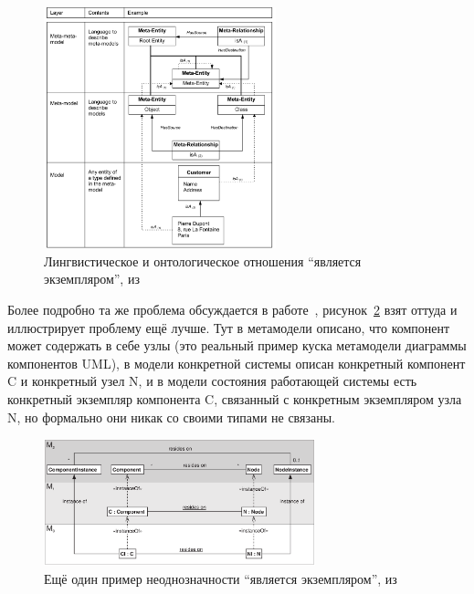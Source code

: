 \documentclass[a5paper]{article}
\begin{document}
\begin{figure}
	\begin{center}
		\includegraphics[width=0.6\textwidth]{bezivinIsA.png}
	\end{center}
	\caption{Лингвистическое и онтологическое отношения ``является экземпляром'', из~\cite{bezivin1997ontology}}
	\label{figure:isAExample}
\end{figure}

Более подробно та же проблема обсуждается в работе~\cite{atkinson2001multilevel}, рисунок~\ref{figure:atkinsonInstanceOf} взят оттуда и иллюстрирует проблему ещё лучше. Тут в метамодели описано, что компонент может содержать в себе узлы (это реальный пример куска метамодели диаграммы компонентов UML), в модели конкретной системы описан конкретный компонент C и конкретный узел N, и в модели состояния работающей системы есть конкретный экземпляр компонента C, связанный с конкретным экземпляром узла N, но формально они никак со своими типами не связаны.

\begin{figure}
	\begin{center}
		\includegraphics[width=0.7\textwidth]{atkinsonInstanceOf.png}
	\end{center}
	\caption{Ещё один пример неоднозначности ``является экземпляром'', из~\cite{atkinson2001multilevel}}
	\label{figure:atkinsonInstanceOf}
\end{figure}
\end{document}
